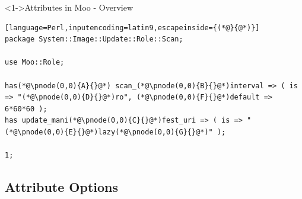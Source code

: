 \documentclass[ngerman,xcolor={table,dvipsnames},smaller,compress,hyperref={bookmarks,colorlinks},handout]{beamer}%
\begin{document}
\begin{frame}[t,fragile]

\begin{block}<1->{Attributes in Moo - Overview}
\scriptsize
\begin{lstlisting}[language=Perl,inputencoding=latin9,escapeinside={(*@}{@*)}]
package System::Image::Update::Role::Scan;

use Moo::Role;

has(*@\pnode(0,0){A}{}@*) scan_(*@\pnode(0,0){B}{}@*)interval => ( is => "(*@\pnode(0,0){D}{}@*)ro", (*@\pnode(0,0){F}{}@*)default => 6*60*60 );
has update_mani(*@\pnode(0,0){C}{}@*)fest_uri => ( is => "(*@\pnode(0,0){E}{}@*)lazy(*@\pnode(0,0){G}{}@*)" );

1;
\end{lstlisting}
\end{block}

\begin{itemize}
\end{itemize}

\end{frame}

\subsection{Attribute Options}
\end{document}
